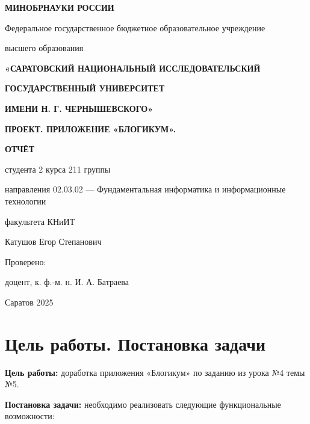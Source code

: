 \documentclass[15pt,a4paper]{extarticle}
\begin{document}
\begin{titlepage}
    \centering
    \vspace*{1cm}

    \textbf{МИНОБРНАУКИ РОССИИ}
    
    Федеральное государственное бюджетное образовательное учреждение
    
    высшего образования
    
    \textbf{«САРАТОВСКИЙ НАЦИОНАЛЬНЫЙ ИССЛЕДОВАТЕЛЬСКИЙ}
    
    \textbf{ГОСУДАРСТВЕННЫЙ УНИВЕРСИТЕТ}
    
    \textbf{ИМЕНИ Н. Г. ЧЕРНЫШЕВСКОГО»}
    
    \vspace{1.5cm}
    
    \textbf{ПРОЕКТ. ПРИЛОЖЕНИЕ «БЛОГИКУМ».}
    
    \vspace{2cm}
    
    \textbf{ОТЧЁТ}
    
    \vspace{1cm}
    
    \raggedright
    студента 2 курса 211 группы
    
    направления 02.03.02 — Фундаментальная информатика и информационные технологии
    
    факультета КНиИТ
    
    Катушов Егор Степанович
    
    \vspace{2cm}
    
    Проверено:
    
    доцент, к. ф.-м. н. \hfill \underline{\hspace{3cm}} \hfill И. А. Батраева
    
    \vfill
    
    \centering
    Саратов 2025
    
\end{titlepage}

\tableofcontents
\newpage

\section{Цель работы. Постановка задачи}

\textbf{Цель работы:} доработка приложения «Блогикум» по заданию из урока №4 темы №5.

\textbf{Постановка задачи:} необходимо реализовать следующие функциональные возможности:
\end{document}
